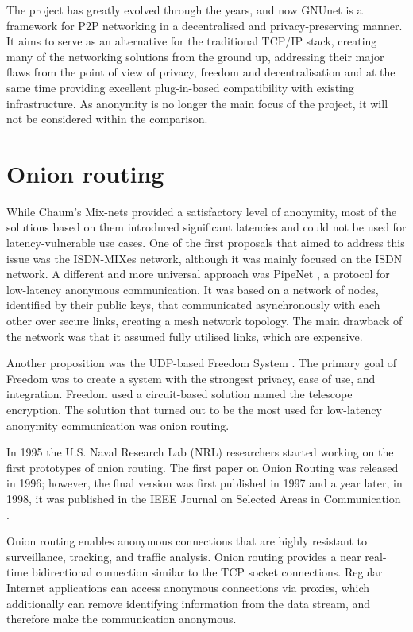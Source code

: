 The project has greatly evolved through the years, and now GNUnet is a framework for P2P networking in a decentralised and privacy-preserving manner. It aims to serve as an alternative for the traditional TCP/IP stack, creating many of the networking solutions from the ground up, addressing their major flaws from the point of view of privacy, freedom and decentralisation and at the same time providing excellent plug-in-based compatibility with existing infrastructure. As anonymity is no longer the main focus of the project, it will not be considered within the comparison.


\section{Onion routing}
While Chaum's Mix-nets provided a satisfactory level of anonymity, most of the solutions based on them introduced significant latencies and could not be used for latency-vulnerable use cases. One of the first proposals that aimed to address this issue was the ISDN-MIXes network, although it was mainly focused on the ISDN network. A different and more universal approach was PipeNet \cite{pipenet}, a protocol for low-latency anonymous communication. It was based on a network of nodes, identified by their public keys, that communicated asynchronously with each other over secure links, creating a mesh network topology. The main drawback of the network was that it assumed fully utilised links, which are expensive.

Another proposition was the UDP-based Freedom System \cite{freedom}. The primary goal of Freedom was to create a system with the strongest privacy, ease of use, and integration. Freedom used a circuit-based solution named the telescope encryption.
The solution that turned out to be the most used for low-latency anonymity communication was onion routing.

In 1995 the U.S. Naval Research Lab (NRL) researchers started working on the first prototypes of onion routing. The first paper on Onion Routing was released in 1996; however, the final version was first published in 1997 and a year later, in 1998, it was published in the IEEE Journal on Selected Areas in Communication \cite{onion-routing98}.

Onion routing enables anonymous connections that are highly resistant to surveillance, tracking, and traffic analysis. Onion routing provides a near real-time bidirectional connection similar to the TCP socket connections. Regular Internet applications can access anonymous connections via proxies, which additionally can remove identifying information from the data stream, and therefore make the communication anonymous.

